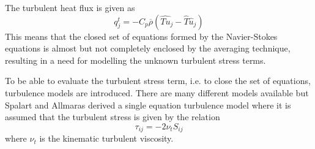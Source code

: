 The turbulent heat flux is given as
\begin{equation}
  q_j^t = -C_p\overline{\rho}\left(\widehat{Tu}_j-\hat{T}\hat{u}_j\right) \label{eq:FavreEnd}
\end{equation}
This means that the closed set of equations formed by the Navier-Stokes equations is almost but not completely enclosed by the averaging technique, resulting in a need for modelling the unknown turbulent stress terms.

To be able to evaluate the turbulent stress term, i.e. to close the set of equations, turbulence models are introduced. There are many different models available but Spalart and Allmaras \cite{SA} derived a single equation turbulence model where it is assumed that the turbulent stress is given by the relation 
\begin{equation}
  \tau_{ij} = -2\nu_t{S}_{ij}
\end{equation}
where $\nu_t$ is the kinematic turbulent viscosity.

